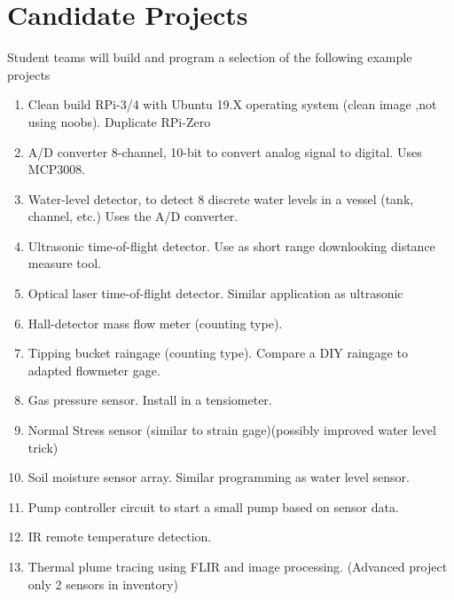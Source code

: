 \documentclass[12pt]{article}
\begin{document}
\section*{Candidate Projects}
Student teams will build and program a selection of the following example projects
\begin{enumerate}
\item Clean build RPi-3/4 with Ubuntu 19.X operating system (clean image ,not using noobs). Duplicate RPi-Zero
\item A/D converter 8-channel, 10-bit to convert analog signal to digital. Uses MCP3008.
\item Water-level detector, to detect 8 discrete water levels in a vessel (tank, channel, etc.) Uses the A/D converter.
\item Ultrasonic time-of-flight detector.  Use as short range downlooking distance measure tool.
\item Optical laser time-of-flight detector.   Similar application as ultrasonic
\item Hall-detector mass flow meter (counting type).
\item Tipping bucket raingage (counting type). Compare a DIY raingage to adapted flowmeter gage.
\item Gas pressure sensor.  Install in a tensiometer.
\item Normal Stress sensor (similar to strain gage)(possibly improved water level trick)
\item Soil moisture sensor array.  Similar programming as water level sensor.
\item Pump controller circuit to start a small pump based on sensor data. 
\item IR remote temperature detection.
\item Thermal plume tracing using FLIR and image processing. (Advanced project only 2 sensors in inventory)
\end{enumerate}

\newpage
\end{document}
